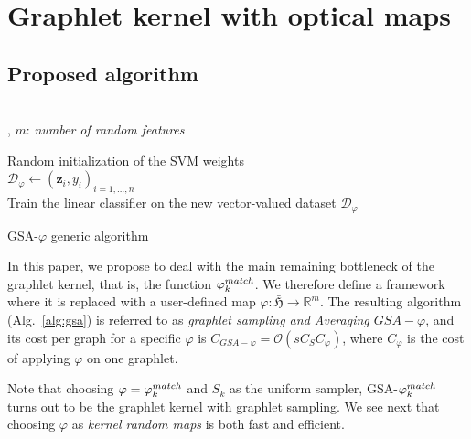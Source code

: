 \documentclass{article}
\begin{document}
\section{Graphlet kernel with optical maps} \label{ssed to get a lowerec:pagestyle}
\subsection{Proposed algorithm}
\label{sec:algo}
\begin{algorithm}[h]\label{alg:gsa}
\DontPrintSemicolon
  \\
  , $m$: \emph{number of random features}\\
  
  \Algo{\\}
  Random initialization of the SVM weights\\
  $\mathcal{D}_{\varphi}\gets (\mathbf{z}_i,y_i)_{i=1,\ldots, n}$\\
  Train the linear classifier on the new vector-valued dataset $\mathcal{D}_{\varphi}$
\caption{GSA-$\varphi$ generic algorithm}
\end{algorithm}

In this paper, we propose to deal with the main remaining bottleneck of the graphlet kernel, that is, the function $\varphi^{match}_k$. We therefore define a framework where it is replaced with a user-defined map $\varphi: \bar{\mathfrak{H}} \to \mathbb{R}^m$. %
The resulting algorithm (Alg.~\ref{alg:gsa}) is referred to as \emph{graphlet sampling and Averaging $GSA-\varphi$}, and its cost per graph for a specific $\varphi$ is $C_{GSA-\varphi}= \mathcal{O}\left(s C_S C_{\varphi}\right)$, where $C_{\varphi}$ is the cost of applying $\varphi$ on one graphlet. 

Note that choosing $\varphi = \varphi^{match}_k$ and $S_k$ as the uniform sampler, GSA-$\varphi^{match}_k$ turns out to be the  graphlet kernel with graphlet sampling.  We see next that choosing $\varphi$ as \emph{kernel random maps} is both fast and efficient.
\end{document}
